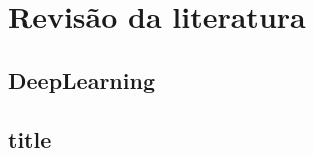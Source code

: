 \chapter{Revisão da literatura}
\label{chap:revisao}

\section{DeepLearning}
\label{sec:digitaltwin}

\section{title}
\label{sec:digitaltwin}
